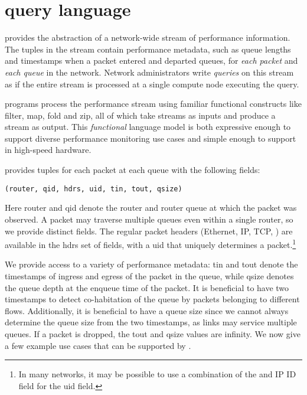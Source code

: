 \section{\TheSystem query language}
\label{sec:language}
\TheSystem provides the abstraction of a network-wide stream of performance
information. The tuples in the stream contain performance metadata, such as
queue lengths and timestamps when a packet entered and departed queues, for {\em
  each packet} and {\em each queue} in the network. Network administrators write
{\em queries} on this stream as if the entire stream is processed at a single
compute node executing the query.

\TheSystem programs process the performance stream using familiar functional
constructs like {\ct filter}, {\ct map}, {\ct fold} and {\ct zip}, all of which
take streams as inputs and produce a stream as output. This {\em functional}
language model is both expressive enough to support diverse performance monitoring use
cases and simple enough to support in high-speed hardware.

 \TheSystem provides tuples for each packet at
each queue with the following fields:
\begin{lstlisting}
(router, qid, hdrs, uid, tin, tout, qsize)
\end{lstlisting}
Here {\ct router} and {\ct qid} denote the router and router queue at which the
packet was observed. A packet may traverse multiple queues even within a single
router, so we provide distinct fields. The regular packet headers (Ethernet, IP,
TCP, \etc) are available in the {\ct hdrs} set of fields, with a {\ct uid} that
uniquely determines a packet.\footnote{In many networks, it may be possible to
  use a combination of the \txtftuple and IP ID field for the {\ct uid} field.}

We provide access to a variety of performance metadata: {\ct tin} and {\ct tout}
denote the timestamps of ingress and egress of the packet in the queue, while
{\ct qsize} denotes the queue depth at the enqueue time of the packet. It is
beneficial to have two timestamps to detect co-habitation of the queue by
packets belonging to different flows. Additionally, it is beneficial to have a
queue size since we cannot always determine the queue size from the two
timestamps, as links may service multiple queues. If a packet
is dropped, the {\ct tout} and {\ct qsize} values are {\ct infinity.} We now
give a few example use cases that can be supported by \TheSystem.

